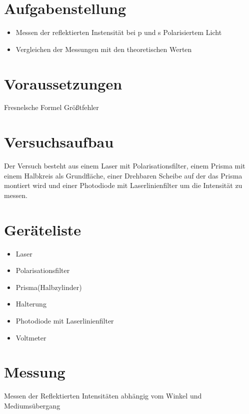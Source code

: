 \documentclass[a4paper]{article}
\begin{document}
\section{Aufgabenstellung}
\begin{itemize}
  \item Messen der reflektierten Instensität bei p und s Polarisiertem Licht 
  \item Vergleichen der Messungen mit den theoretischen Werten
\end{itemize}

\section{Voraussetzungen}
  Fresnelsche Formel
  Größtfehler

\section{Versuchsaufbau}
  Der Versuch besteht aus einem Laser mit Polarisationsfilter, einem Prisma mit einem Halbkreis als Grundfläche, einer Drehbaren Scheibe auf der das Prisma montiert wird und einer Photodiode mit Laserlinienfilter um die Intensität zu messen.



\section{Geräteliste}
\begin{itemize}
  \item Laser 
  \item Polarisationsfilter 
  \item Prisma(Halbzylinder) 
  \item Halterung
  \item Photodiode mit Laserlinienfilter
  \item Voltmeter
\end{itemize}

\section{Messung}

Messen der Reflektierten Intensitäten abhängig vom Winkel und Mediumsübergang
\end{document}
